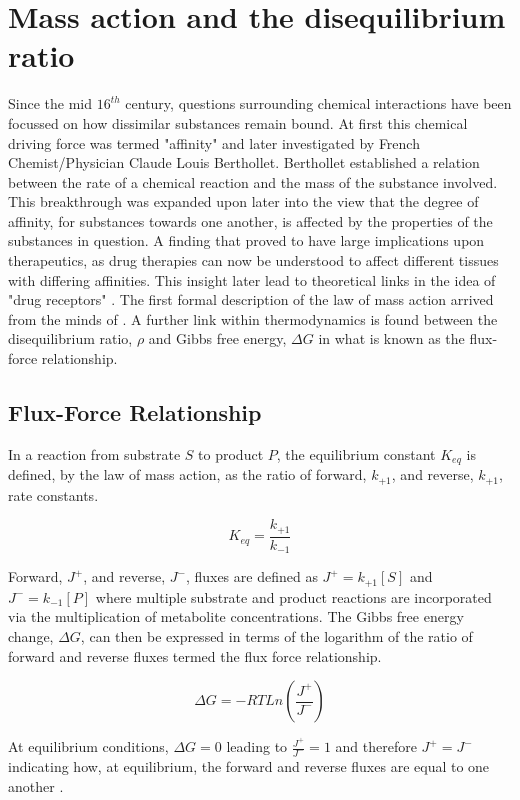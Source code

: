 \section{Mass action and the disequilibrium ratio}
Since the mid $16^{th}$ century, questions surrounding chemical interactions have been focussed on how dissimilar substances remain bound. At first this chemical driving force was termed "affinity" and later investigated by French Chemist/Physician Claude Louis Berthollet. Berthollet established a relation between the rate of a chemical reaction and the mass of the substance involved. This breakthrough was expanded upon later into the view that the degree of affinity, for substances towards one another, is affected by the properties of the substances in question. A finding that proved to have large implications upon therapeutics, as drug therapies can now be understood to affect different tissues with differing affinities. This insight later lead to theoretical links in the idea of "drug receptors" \cite{Ferner2016,Voit2015}. The first formal description of the law of mass action arrived from the minds of \citeauthor{Waage1986}. A further link within thermodynamics is found between the disequilibrium ratio, $\rho$ and Gibbs free energy, $\Delta G$ in what is known as the flux-force relationship.

\subsection{Flux-Force Relationship}
In a reaction from substrate $S$ to product $P$, the equilibrium constant $K_{eq}$ is defined, by the law of mass action, as the ratio of forward, $k_{+1}$, and reverse, $k_{+1}$, rate constants.

\begin{equation}
K_{eq}= \frac{k_{+1}}{k_{-1}}
\end{equation}

Forward, $J^+$, and reverse, $J^-$, fluxes are defined as $J^+ = k_{+1}[S]$ and $J^- = k_{-1}[P]$ where multiple substrate and product reactions are incorporated via the multiplication of metabolite concentrations.
The Gibbs free energy change, $\Delta G$, can then be expressed in terms of the logarithm of the ratio of forward and reverse fluxes termed the flux force relationship.

\begin{equation}
\Delta G = -RTLn(\frac{J^+}{J^-})
\end{equation}

At equilibrium conditions, $\Delta G = 0$ leading to $\frac{J^+}{J^-} = 1$ and therefore $J^+=J^-$ indicating how, at equilibrium, the forward and reverse fluxes are equal to one another \citep{Beard2007}. 

